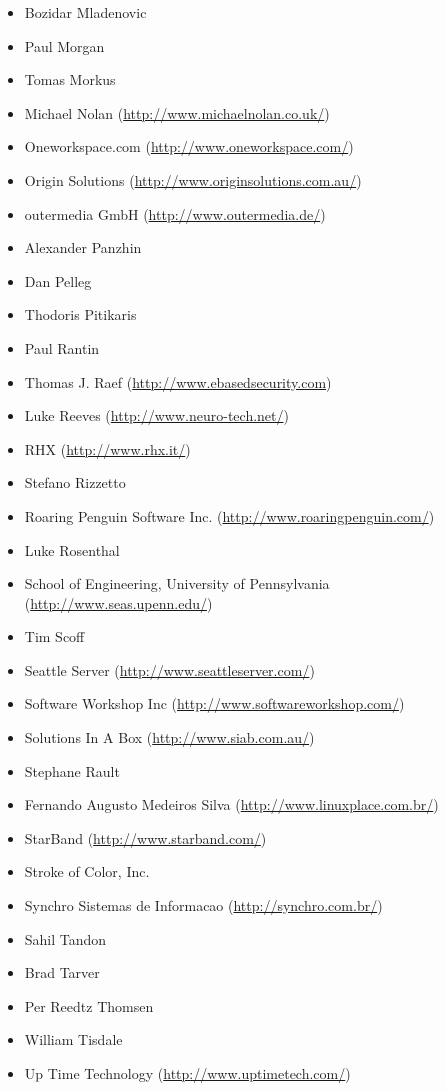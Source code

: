 \documentclass[a4paper,titlepage,12pt]{article}
\begin{document}
\begin{itemize}
	\item Bozidar Mladenovic
	\item Paul Morgan
	\item Tomas Morkus
	\item Michael Nolan (\url{http://www.michaelnolan.co.uk/})
	\item Oneworkspace.com (\url{http://www.oneworkspace.com/})
	\item Origin Solutions (\url{http://www.originsolutions.com.au/})
	\item outermedia GmbH (\url{http://www.outermedia.de/})
	\item Alexander Panzhin
	\item Dan Pelleg
	\item Thodoris Pitikaris
	\item Paul Rantin
	\item Thomas J. Raef (\url{http://www.ebasedsecurity.com})
	\item Luke Reeves (\url{http://www.neuro-tech.net/})
	\item RHX (\url{http://www.rhx.it/})
	\item Stefano Rizzetto
	\item Roaring Penguin Software Inc. (\url{http://www.roaringpenguin.com/})
	\item Luke Rosenthal
	\item School of Engineering, University of Pennsylvania (\url{http://www.seas.upenn.edu/})
	\item Tim Scoff
	\item Seattle Server (\url{http://www.seattleserver.com/})
	\item Software Workshop Inc (\url{http://www.softwareworkshop.com/})
	\item Solutions In A Box (\url{http://www.siab.com.au/})
	\item Stephane Rault
	\item Fernando Augusto Medeiros Silva (\url{http://www.linuxplace.com.br/})
	\item StarBand (\url{http://www.starband.com/})
	\item Stroke of Color, Inc.
	\item Synchro Sistemas de Informacao (\url{http://synchro.com.br/})
	\item Sahil Tandon
	\item Brad Tarver
	\item Per Reedtz Thomsen
	\item William Tisdale
	\item Up Time Technology (\url{http://www.uptimetech.com/})

\end{itemize}
\end{document}
